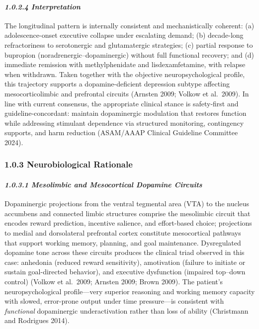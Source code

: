 \paragraph{\texorpdfstring{\emph{1.0.2.4 Interpretation}}{1.0.2.4 Interpretation}}\label{10b_traad-interpretation}

The longitudinal pattern is internally consistent and mechanistically coherent: (a) adolescence-onset executive collapse under escalating demand; (b) decade-long refractoriness to serotonergic and glutamatergic strategies; (c) partial response to bupropion (noradrenergic--dopaminergic) without full functional recovery; and (d) immediate remission with methylphenidate and lisdexamfetamine, with relapse when withdrawn. Taken together with the objective neuropsychological profile, this trajectory supports a dopamine-deficient depression subtype affecting mesocorticolimbic and prefrontal circuits (Arnsten 2009; Volkow et al.~2009). In line with current consensus, the appropriate clinical stance is safety-first and guideline-concordant: maintain dopaminergic modulation that restores function while addressing stimulant dependence via structured monitoring, contingency supports, and harm reduction (ASAM/AAAP Clinical Guideline Committee 2024).

\subsubsection{1.0.3 Neurobiological Rationale}\label{10b_traad-neurobiological-rationale}

\paragraph{\texorpdfstring{\emph{1.0.3.1 Mesolimbic and Mesocortical Dopamine Circuits}}{1.0.3.1 Mesolimbic and Mesocortical Dopamine Circuits}}\label{10b_traad-mesolimbic-and-mesocortical-dopamine-circuits}

Dopaminergic projections from the ventral tegmental area (VTA) to the nucleus accumbens and connected limbic structures comprise the mesolimbic circuit that encodes reward prediction, incentive salience, and effort-based choice; projections to medial and dorsolateral prefrontal cortex constitute mesocortical pathways that support working memory, planning, and goal maintenance. Dysregulated dopamine tone across these circuits produces the clinical triad observed in this case: anhedonia (reduced reward sensitivity), amotivation (failure to initiate or sustain goal-directed behavior), and executive dysfunction (impaired top--down control) (Volkow et al.~2009; Arnsten 2009; Brown 2009). The patient's neuropsychological profile---very superior reasoning and working memory capacity with slowed, error-prone output under time pressure---is consistent with \emph{functional} dopaminergic underactivation rather than loss of ability (Christmann and Rodrigues 2014).

